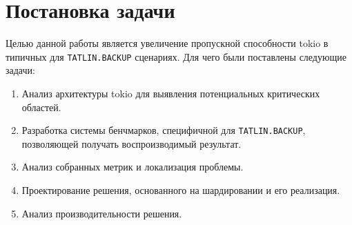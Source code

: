 
\section{Постановка задачи}
\label{sec:task}

Целью данной работы является увеличение пропускной способности tokio в типичных для \verb|TATLIN.BACKUP| сценариях. Для чего были поставлены следующие задачи:

\begin{enumerate}
    \item Анализ архитектуры tokio для выявления потенциальных критических областей.
    \item Разработка системы бенчмарков, специфичной для \verb|TATLIN.BACKUP|, позволяющей получать воспроизводимый результат.
    \item Анализ собранных метрик и локализация проблемы.
    \item Проектирование решения, основанного на шардировании и его реализация.
    \item Анализ производительности решения.
\end{enumerate}
